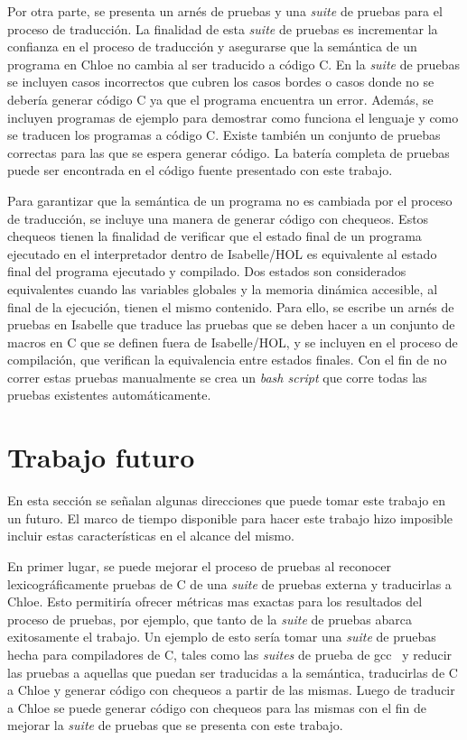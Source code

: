 Por otra parte, se presenta un arnés de pruebas y una \textit{suite} de pruebas para el proceso de traducción.
La finalidad de esta \textit{suite} de pruebas es incrementar la confianza en el proceso de traducción y asegurarse que la semántica de un programa en Chloe no cambia al ser traducido a código C.
En la \textit{suite} de pruebas se incluyen casos incorrectos que cubren los casos bordes o casos donde no se debería generar código C ya que el programa encuentra un error.
Además, se incluyen programas de ejemplo para demostrar como funciona el lenguaje y como se traducen los programas a código C.
Existe también un conjunto de pruebas correctas para las que se espera generar código.
La batería completa de pruebas puede ser encontrada en el código fuente presentado con este trabajo.

Para garantizar que la semántica de un programa no es cambiada por el proceso de traducción, se incluye una manera de generar código con chequeos.
Estos chequeos tienen la finalidad de verificar que el estado final de un programa ejecutado en el interpretador dentro de Isabelle/HOL es equivalente al estado final del programa ejecutado y compilado.
Dos estados son considerados equivalentes cuando las variables globales y la memoria dinámica accesible, al final de la ejecución, tienen el mismo contenido.
Para ello, se escribe un arnés de pruebas en Isabelle que traduce las pruebas que se deben hacer a un conjunto de macros en C que se definen fuera de Isabelle/HOL, y se incluyen en el proceso de compilación, que verifican la equivalencia entre estados finales.
Con el fin de no correr estas pruebas manualmente se crea un \textit{bash script} que corre todas las pruebas existentes automáticamente.

\section{Trabajo futuro}

En esta sección se señalan algunas direcciones que puede tomar este trabajo en un futuro.
El marco de tiempo disponible para hacer este trabajo hizo imposible incluir estas características en el alcance del mismo.

En primer lugar, se puede mejorar el proceso de pruebas al reconocer lexicográficamente pruebas de C de una \textit{suite} de pruebas externa y traducirlas a Chloe.
Esto permitiría ofrecer métricas mas exactas para los resultados del proceso de pruebas, por ejemplo, que tanto de la \textit{suite} de pruebas abarca exitosamente el trabajo.
Un ejemplo de esto sería tomar una \textit{suite} de pruebas hecha para compiladores de C, tales como las \textit{suites} de prueba de gcc~\citep{gcc-tests} y reducir las pruebas a aquellas que puedan ser traducidas a la semántica, traducirlas de C a Chloe y generar código con chequeos a partir de las mismas.
Luego de traducir a Chloe se puede generar código con chequeos para las mismas con el fin de mejorar la \textit{suite} de pruebas que se presenta con este trabajo.

